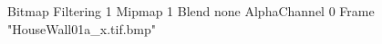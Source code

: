{Bitmap
	{Filtering 1}
	{Mipmap 1}
	{Blend none}
	{AlphaChannel 0}
	{Frame "HouseWall01a_x.tif.bmp"}
}
